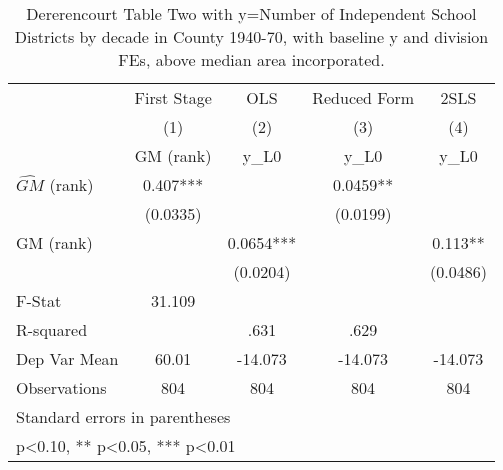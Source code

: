 \begin{table}[htbp]\centering
\def\sym#1{\ifmmode^{#1}\else\(^{#1}\)\fi}
\caption{Dererencourt Table Two with y=Number of Independent School Districts by decade in County 1940-70, with baseline y and division FEs, above median area incorporated.}
\begin{tabular}{l*{4}{c}}
\toprule
                    & First Stage   &         OLS   &Reduced Form   &        2SLS   \\
                    &\multicolumn{1}{c}{(1)}&\multicolumn{1}{c}{(2)}&\multicolumn{1}{c}{(3)}&\multicolumn{1}{c}{(4)}\\
                    &\multicolumn{1}{c}{GM  (rank)}&\multicolumn{1}{c}{y\_L0}&\multicolumn{1}{c}{y\_L0}&\multicolumn{1}{c}{y\_L0}\\
\midrule
$\hat{GM}$ (rank)   &       0.407***&               &      0.0459** &               \\
                    &    (0.0335)   &               &    (0.0199)   &               \\
\addlinespace
GM  (rank)          &               &      0.0654***&               &       0.113** \\
                    &               &    (0.0204)   &               &    (0.0486)   \\
\midrule
F-Stat              &      31.109   &               &               &               \\
R-squared           &               &        .631   &        .629   &               \\
Dep Var Mean        &       60.01   &     -14.073   &     -14.073   &     -14.073   \\
Observations        &         804   &         804   &         804   &         804   \\
\bottomrule
\multicolumn{5}{l}{\footnotesize Standard errors in parentheses}\\
\multicolumn{5}{l}{\footnotesize * p<0.10, ** p<0.05, *** p<0.01}\\
\end{tabular}
\end{table}
